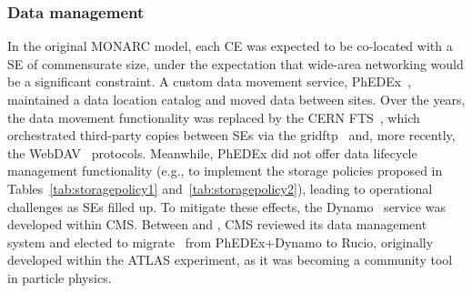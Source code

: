 \subsubsection{Data management}
\label{sec:data-management}

In the original \gls{MONARC} model, each \gls{CE} was expected to be co-located with a \gls{SE} of commensurate size, under the expectation that wide-area networking would be a significant constraint. A custom data movement service, PhEDEx~\cite{Rehn2006,Tuura:2008zz}, maintained a data location catalog and moved data between sites. Over the years, the data movement functionality was replaced by the CERN \gls{FTS}~\cite{Ayllon:2014wca}, which orchestrated third-party copies between SEs via the gridftp~\cite{allcock2003,Mandrichenko2003} and, more recently, the WebDAV~\cite{Bockelman:2020isd} protocols. Meanwhile, PhEDEx did not offer data lifecycle management functionality (e.g., to implement the storage policies proposed in Tables~\ref{tab:storagepolicy1} and~\ref{tab:storagepolicy2}), leading to operational challenges as SEs filled up. To mitigate these effects, the Dynamo~\cite{dynamo} service was developed within CMS. Between \RunTwo and \RunThree, CMS reviewed its data management system and elected to migrate~\cite{toRucio} from PhEDEx+Dynamo to Rucio, originally developed within the ATLAS experiment, as it was becoming a community tool in particle physics.


